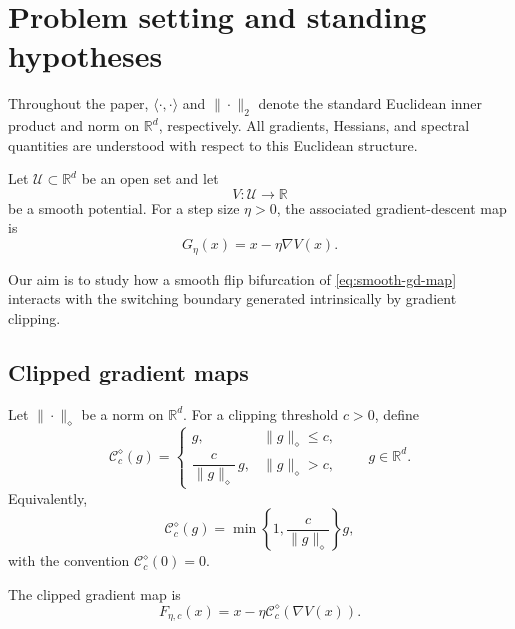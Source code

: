 
\section{Problem setting and standing hypotheses}
\label{sec:setting}

Throughout the paper, $\langle\cdot,\cdot\rangle$ and
$\|\cdot\|_2$ denote the standard Euclidean inner product and norm
on $\mathbb{R}^d$, respectively. All gradients, Hessians, and spectral
quantities are understood with respect to this Euclidean structure.

Let $\mathcal U\subset\mathbb{R}^d$ be an open set and let
\[
V:\mathcal U\to\mathbb{R}
\]
be a smooth potential. For a step size $\eta>0$, the associated
gradient-descent map is
\begin{equation}
G_\eta(x)
=
x-\eta\nabla V(x).
\label{eq:smooth-gd-map}
\end{equation}

Our aim is to study how a smooth flip bifurcation of
\eqref{eq:smooth-gd-map} interacts with the switching boundary
generated intrinsically by gradient clipping.

\subsection{Clipped gradient maps}
\label{subsec:clipped-map}

Let $\|\cdot\|_\diamond$ be a norm on $\mathbb{R}^d$.
For a clipping threshold $c>0$, define
\begin{equation}
\mathcal C_c^\diamond(g)
=
\begin{cases}
g,
&
\|g\|_\diamond\leq c,
\\[1mm]
\dfrac{c}{\|g\|_\diamond}\,g,
&
\|g\|_\diamond>c,
\end{cases}
\qquad
g\in\mathbb{R}^d.
\label{eq:clipping-operator}
\end{equation}
Equivalently,
\[
\mathcal C_c^\diamond(g)
=
\min\left\{
1,\frac{c}{\|g\|_\diamond}
\right\}g,
\]
with the convention $\mathcal C_c^\diamond(0)=0$.

The clipped gradient map is
\begin{equation}
F_{\eta,c}(x)
=
x-\eta\mathcal C_c^\diamond(\nabla V(x)).
\label{eq:clipped-gradient-map}
\end{equation}

